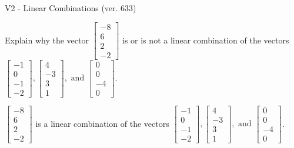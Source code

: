 \begin{exercise}
  \begin{exerciseTitle}V2 - Linear Combinations (ver. 633)\end{exerciseTitle}
  \begin{exerciseStatement}
    Explain why the vector \(\left[\begin{array}{c}
-8 \\
6 \\
2 \\
-2
\end{array}\right]\)  is or is not a linear 
	combination of the vectors \(\left[\begin{array}{c}
-1 \\
0 \\
-1 \\
-2
\end{array}\right] , \left[\begin{array}{c}
4 \\
-3 \\
3 \\
1
\end{array}\right] , \text{ and } \left[\begin{array}{c}
0 \\
0 \\
-4 \\
0
\end{array}\right]\).
	


  \end{exerciseStatement}
  \begin{exerciseAnswer}
   \(\left[\begin{array}{c}
-8 \\
6 \\
2 \\
-2
\end{array}\right]\) 
  	 is  
	a linear combination of the vectors \(\left[\begin{array}{c}
-1 \\
0 \\
-1 \\
-2
\end{array}\right] , \left[\begin{array}{c}
4 \\
-3 \\
3 \\
1
\end{array}\right] , \text{ and } \left[\begin{array}{c}
0 \\
0 \\
-4 \\
0
\end{array}\right]\).

	
  


  \end{exerciseAnswer}
\end{exercise}
